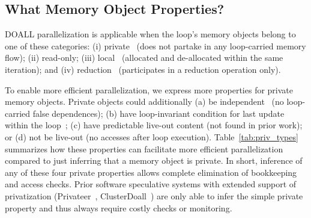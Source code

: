 \subsection{What Memory Object Properties?}

DOALL parallelization is applicable when the loop's memory objects belong to one
of these categories: (i) private~\cite{privateer,LRPD,ARRAY_privatization} (does
not partake in any loop-carried memory flow); (ii) read-only; (iii)
local~\cite{corD,privateer,clusterDoall} (allocated and de-allocated within the
same iteration); and (iv) reduction~\cite{privateer,LRPD} (participates in a
reduction operation only).
%

To enable more efficient parallelization, we express more properties for private
memory objects. Private objects could additionally (a) be
independent~\cite{ARRAY_privatization} (no loop-carried false dependences); (b)
have loop-invariant condition for last update within the
loop~\cite{ARRAY_privatization}; (c) have predictable live-out content (not
found in prior work); or (d) not be live-out (no accesses after loop execution).
%
%
Table~\ref{tab:priv_types} summarizes how these properties can facilitate more
efficient parallelization compared to just inferring that a memory object is
private. In short, inference of any of these four private properties allows
complete elimination of bookkeeping and access checks. Prior software
speculative systems with extended support of privatization (Privateer~\cite{},
ClusterDoall~\cite{}) are only able to infer the simple private property and
thus always require costly checks or monitoring.






